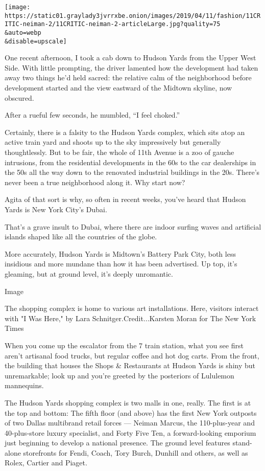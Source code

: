 \texttt{[image: https://static01.graylady3jvrrxbe.onion/images/2019/04/11/fashion/11CRITIC-neiman-2/11CRITIC-neiman-2-articleLarge.jpg?quality=75\\\&auto=webp\\\&disable=upscale]}

One recent afternoon, I took a cab down to Hudson Yards from the Upper
West Side. With little prompting, the driver lamented how the
development had taken away two things he'd held sacred: the relative
calm of the neighborhood before development started and the view
eastward of the Midtown skyline, now obscured.

After a rueful few seconds, he mumbled, ``I feel choked.''

Certainly, there is a falsity to the Hudson Yards complex, which sits
atop an active train yard and shoots up to the sky impressively but
generally thoughtlessly. But to be fair, the whole of 11th Avenue is a
zoo of gauche intrusions, from the residential developments in the 60s
to the car dealerships in the 50s all the way down to the renovated
industrial buildings in the 20s. There's never been a true neighborhood
along it. Why start now?

Agita of that sort is why, so often in recent weeks, you've heard that
Hudson Yards is New York City's Dubai.

That's a grave insult to Dubai, where there are indoor surfing waves and
artificial islands shaped like all the countries of the globe.

More accurately, Hudson Yards is Midtown's Battery Park City, both less
insidious and more mundane than how it has been advertised. Up top, it's
gleaming, but at ground level, it's deeply unromantic.

Image

The shopping complex is home to various art installations. Here,
visitors interact with "I Was Here," by Lara Schnitger.Credit...Karsten
Moran for The New York Times

When you come up the escalator from the 7 train station, what you see
first aren't artisanal food trucks, but regular coffee and hot dog
carts. From the front, the building that houses the Shops \& Restaurants
at Hudson Yards is shiny but unremarkable; look up and you're greeted by
the posteriors of Lululemon mannequins.

The Hudson Yards shopping complex is two malls in one, really. The first
is at the top and bottom: The fifth floor (and above) has the first New
York outposts of two Dallas multibrand retail forces --- Neiman Marcus,
the 110-plus-year and 40-plus-store luxury specialist, and Forty Five
Ten, a forward-looking emporium just beginning to develop a national
presence. The ground level features stand-alone storefronts for Fendi,
Coach, Tory Burch, Dunhill and others, as well as Rolex, Cartier and
Piaget.

